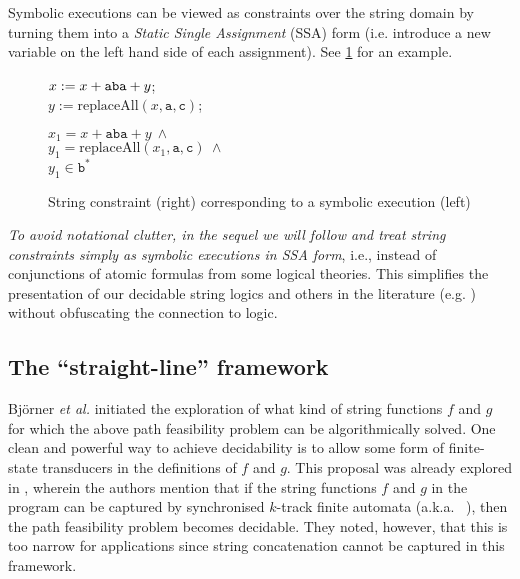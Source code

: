 {Symbolic executions can be viewed as constraints over the 
string domain by turning them
into a \emph{Static Single Assignment} (SSA) form (i.e. introduce a new 
variable 
on the left hand side of each assignment). See \ref{fig:SSA} for an
example.
\begin{figure}
    \qquad
    \begin{minipage}{.49\linewidth}
        $x := x + \text{\texttt{aba}} + y$;\\
        $y := \text{replaceAll}(x,\texttt{a},\texttt{c})$;\\
    \end{minipage}
    \quad
    \begin{minipage}{.49\linewidth}
        $x_1 = x + \texttt{aba} + y\ \wedge$ \\
        $y_1 = \text{replaceAll}(x_1,\texttt{a},\texttt{c})\ \wedge$ \\
        $y_1 \in \texttt{b}^*$
    \end{minipage}
    \caption{String constraint (right) corresponding to a symbolic execution
    (left)
    \label{fig:SSA}}
\end{figure}

\emph{To avoid notational clutter, in the sequel we will follow \cite{BTV09}
and treat string 
constraints simply as symbolic executions in SSA form}, i.e., instead of 
conjunctions of atomic formulas from some logical theories. 
This simplifies 
the presentation of our decidable string logics and others in the literature 
(e.g. \cite{LB16,CCHLW18}) without obfuscating the connection to logic.


\subsection{The ``straight-line'' framework}
Bj\"{o}rner \emph{et al.} \cite{BTV09} initiated the exploration
of what kind of string functions $f$ and $g$ for which the above path 
feasibility problem can be algorithmically solved. 
One clean and powerful way to achieve decidability is to 
allow some form of finite-state transducers in the definitions of $f$
and $g$.
%
This proposal was already explored in \cite{BTV09}, wherein the authors mention
that
%
if the string functions $f$ and $g$ in the program can be captured by 
synchronised $k$-track finite automata (a.k.a.~ 
\cite{BG04}), then
the path feasibility problem becomes decidable. They noted, however, that
this is too narrow for applications since string concatenation cannot be
captured in this framework. 

}
